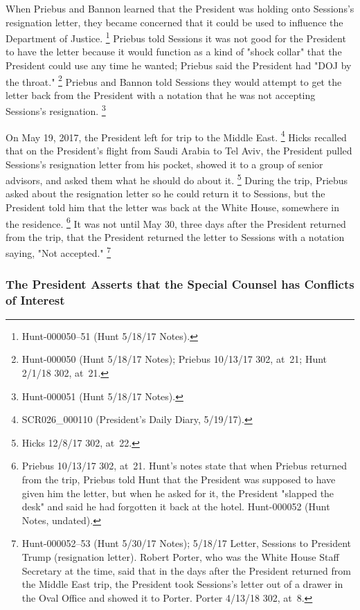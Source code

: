 {When Priebus and Bannon learned that the President was holding onto Sessions's resignation letter, they became concerned that it could be used to influence the Department of Justice.%
\footnote{Hunt-000050--51 (Hunt 5/18/17 Notes).}
Priebus told Sessions it was not good for the President to have the letter because it would function as a kind of "shock collar" that the President could use any time he wanted;
Priebus said the President had "DOJ by the throat."%
\footnote{Hunt-000050 (Hunt 5/18/17 Notes);
Priebus 10/13/17 302, at~21;
Hunt 2/1/18 302, at~21.}
Priebus and Bannon told Sessions they would attempt to get the letter back from the President with a notation that he was not accepting Sessions's resignation.%
\footnote{Hunt-000051 (Hunt 5/18/17 Notes).}

On May 19, 2017, the President left for trip to the Middle East.%
\footnote{SCR026\_000110 (President's Daily Diary, 5/19/17).}
Hicks recalled that on the President's flight from Saudi Arabia to Tel Aviv, the President pulled Sessions's resignation letter from his pocket, showed it to a group of senior advisors, and asked them what he should do about it.%
\footnote{Hicks 12/8/17 302, at~22.}
During the trip, Priebus asked about the resignation letter so he could return it to Sessions, but the President told him that the letter was back at the White House, somewhere in the residence.%
\footnote{Priebus 10/13/17 302, at~21.
Hunt's notes state that when Priebus returned from the trip, Priebus told Hunt that the President was supposed to have given him the letter, but when he asked for it, the President "slapped the desk" and said he had forgotten it back at the hotel.
Hunt-000052 (Hunt Notes, undated).}
It was not until May 30, three days after the President returned from the trip, that the President returned the letter to Sessions with a notation saying, "Not accepted."%
\footnote{Hunt-000052--53 (Hunt 5/30/17 Notes);
5/18/17 Letter, Sessions to President Trump (resignation letter).
Robert Porter, who was the White House Staff Secretary at the time, said that in the days after the President returned from the Middle East trip, the President took Sessions's letter out of a drawer in the Oval Office and showed it to Porter.
Porter 4/13/18 302, at~8.
}

\subsubsection{The President Asserts that the Special Counsel has Conflicts of Interest}

}
